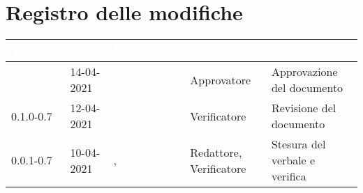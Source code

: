 \section*{Registro delle modifiche}
{
\setcounter{table}{-1}
{
\renewcommand{\arraystretch}{1.5}
\centering
\begin{longtable}{C{1.7cm} | C{2.5cm} | C{3.2cm} | C{2.7cm} | C{4.8cm}}
\textcolor{white}{\textbf{Versione}}&
\textcolor{white}{\textbf{Data}}&
\textcolor{white}{\textbf{Nominativo}}&
\textcolor{white}{\textbf{Ruolo}}&
\textcolor{white}{\textbf{Descrizione}}\\	
\endhead

\Versionedoc{} & 14-04-2021 & \Approvatore{} & Approvatore & Approvazione del documento\\	
0.1.0-0.7 & 12-04-2021 & \SH{} & Verificatore & Revisione del documento\\		
0.0.1-0.7 & 10-04-2021 & \Redattori{}, \ZM{} & Redattore, Verificatore & Stesura del verbale e verifica\\
		
\end{longtable}
}
}
